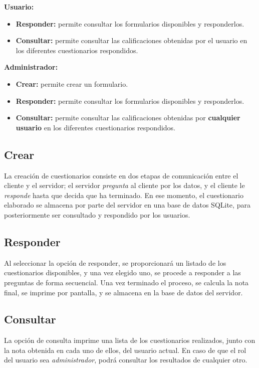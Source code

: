 \documentclass[11pt,a4paper]{article}
\begin{document}
\textbf{Usuario:}
\begin{itemize}
\item \textbf{Responder:} permite consultar los formularios disponibles y responderlos.
\item \textbf{Consultar:} permite consultar las calificaciones obtenidas por el usuario en los diferentes cuestionarios respondidos.
\end{itemize}

\textbf{Administrador:}
\begin{itemize}
\item \textbf{Crear:} permite crear un formulario.
\item \textbf{Responder: } permite consultar los formularios disponibles y responderlos.
\item \textbf{Consultar:} permite consultar las calificaciones obtenidas por \textbf{cualquier usuario} en los diferentes cuestionarios respondidos.
\end{itemize}

\subsection*{Crear}
La creación de cuestionarios consiste en dos etapas de comunicación entre el cliente y el servidor; el servidor \textit{pregunta} al cliente por los datos, y el cliente le \textit{responde} hasta que decida que ha terminado. En ese momento, el cuestionario elaborado se almacena por parte del servidor en una base de datos SQLite, para posteriormente ser consultado y respondido por los usuarios.

\subsection*{Responder}
Al seleccionar la opción de responder, se proporcionará un listado de los cuestionarios disponibles, y una vez elegido uno, se procede a responder a las preguntas de forma secuencial. Una vez terminado el proceso, se calcula la nota final, se imprime por pantalla, y se almacena en la base de datos del servidor.

\subsection*{Consultar}
La opción de consulta imprime una lista de los cuestionarios realizados, junto con la nota obtenida en cada uno de ellos, del usuario actual. En caso de que el rol del usuario sea \textit{administrador}, podrá consultar los resultados de cualquier otro.
\end{document}
